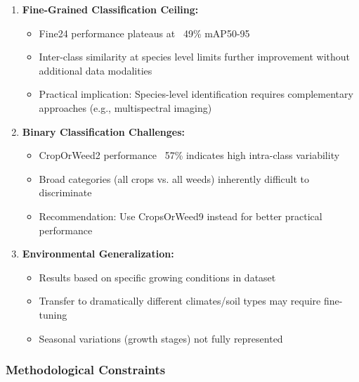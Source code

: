 \begin{enumerate}
    \item \textbf{Fine-Grained Classification Ceiling:}
    \begin{itemize}
        \item Fine24 performance plateaus at ~49\% mAP50-95
        \item Inter-class similarity at species level limits further improvement without additional data modalities
        \item Practical implication: Species-level identification requires complementary approaches (e.g., multispectral imaging)
    \end{itemize}
    
    \item \textbf{Binary Classification Challenges:}
    \begin{itemize}
        \item CropOrWeed2 performance ~57\% indicates high intra-class variability
        \item Broad categories (all crops vs. all weeds) inherently difficult to discriminate
        \item Recommendation: Use CropsOrWeed9 instead for better practical performance
    \end{itemize}
    
    \item \textbf{Environmental Generalization:}
    \begin{itemize}
        \item Results based on specific growing conditions in dataset
        \item Transfer to dramatically different climates/soil types may require fine-tuning
        \item Seasonal variations (growth stages) not fully represented
    \end{itemize}
\end{enumerate}

\subsubsection{Methodological Constraints}

